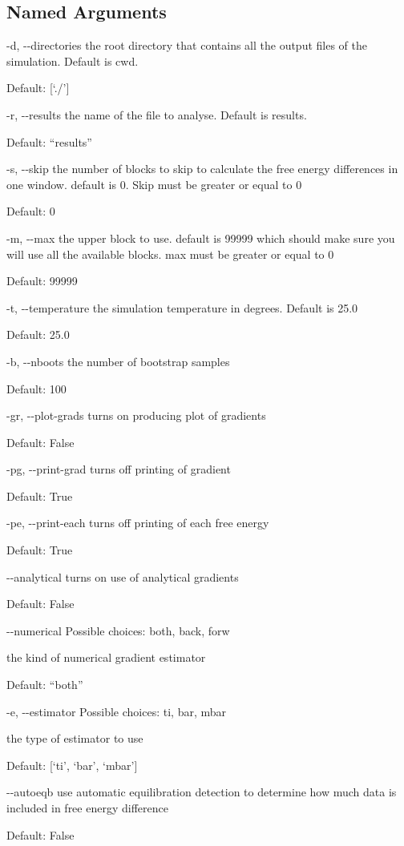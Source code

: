 \documentclass[letterpaper,10pt,english]{sphinxmanual}
\begin{document}
\subsection{Named Arguments}
\label{\detokenize{tools:Named Arguments}}\begin{optionlist}{3cm}
\item [-d, -{-}directories]  
the root directory that contains all the output files of the simulation. Default is cwd.

Default: {[}‘./’{]}
\item [-r, -{-}results]  
the name of the file to analyse. Default is results.

Default: “results”
\item [-s, -{-}skip]  
the number of blocks to skip to calculate the free energy differences in one window. default is 0. Skip must be greater or equal to 0

Default: 0
\item [-m, -{-}max]  
the upper block to use. default is 99999 which should make sure you will use all the available blocks. max must be greater or equal to 0

Default: 99999
\item [-t, -{-}temperature]  
the simulation temperature in degrees. Default is 25.0

Default: 25.0
\item [-b, -{-}nboots]  
the number of bootstrap samples

Default: 100
\item [-gr, -{-}plot-grads]  
turns on producing plot of gradients

Default: False
\item [-pg, -{-}print-grad]  
turns off printing of gradient

Default: True
\item [-pe, -{-}print-each]  
turns off printing of each free energy

Default: True
\item [-{-}analytical]  
turns on use of analytical gradients

Default: False
\item [-{-}numerical]  
Possible choices: both, back, forw

the kind of numerical gradient estimator

Default: “both”
\item [-e, -{-}estimator]  
Possible choices: ti, bar, mbar

the type of estimator to use

Default: {[}‘ti’, ‘bar’, ‘mbar’{]}
\item [-{-}autoeqb]  
use automatic equilibration detection to determine how much data is included in free energy difference

Default: False
\end{optionlist}
\end{document}
